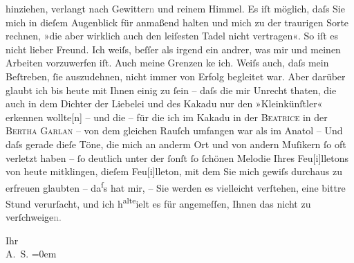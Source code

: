                hinziehen, verlangt nach Gewitter\textcolor{gray}{n} und reinem Himmel. Es iſt
               möglich, daſs Sie mich in dieſem Augenblick für {\pb}anmaßend halten und mich zu der traurigen
               Sorte rechnen, »die aber wirklich auch den leiſesten Tadel nicht vertragen«. So iſt
               es nicht lieber Freund. Ich weiſs, beſſer als irgend ein andrer, was mir und meinen
               Arbeiten vorzuwerfen iſt. Auch meine Grenzen ke{\geminationn} ich.
               Weiſs auch, daſs mein Beſtreben, ſie aus{\pb}zudehnen, nicht immer von Erfolg begleitet war. Aber darüber glaubt ich bis heute
               mit Ihnen einig zu ſein – daſs die mir Unrecht thaten, die auch in dem Dichter der
                  Liebelei und des Kakadu nur den »Kleinkünſtler« erkennen
                  wollte{[}n{]} – und die – für die ich im Kakadu in der \textsc{Beatrice}{ }{\dotstwo} in der \textsc{Ber{\pb}tha
                     Garlan} – von dem gleichen Rauſch umfangen war {\dotstwo} als im Anatol – Und daſs gerade dieſe Töne, die mich an anderm Ort und
               von andern Muſikern ſo oft verletzt haben – ſo deutlich unter der ſonſt ſo ſchönen
               Melodie Ihres Feu{[}i{]}lletons von heute
               mitklingen, dieſem Feu{[}i{]}lleton, mit dem Sie mich gewiſs durchaus {\pb}zu erfreuen glaubten – da\substVorne{}\textsuperscript{ſ}\substDazwischen{}s\substHinten{} hat mir, – Sie werden es vielleicht verſtehen, eine bittre Stund verurſacht,
               und ich h\substVorne{}\textsuperscript{alte}\substDazwischen{}ielt\substHinten{} es für angemeſſen, Ihnen das nicht zu verſchweige\textcolor{gray}{n.}\pend
           
\pstart
           Ihr {\\[\baselineskip]}\spacefill\mbox{A. S.}\pend
           \leftskip=0em{}\endnumbering{}  
      